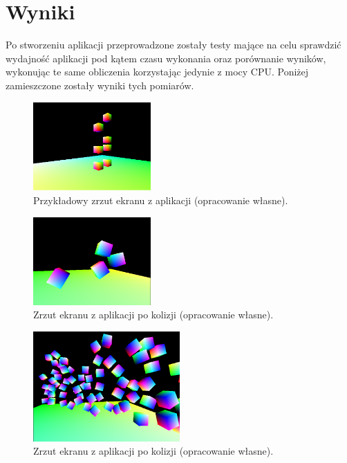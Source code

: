 \chapter{Wyniki}

Po stworzeniu aplikacji przeprowadzone zostały testy mające na celu sprawdzić wydajność aplikacji pod kątem czasu wykonania oraz porównanie wyników, wykonując te same obliczenia korzystając jedynie z mocy CPU. 
Poniżej zamieszczone zostały wyniki tych pomiarów.

\begin{figure}[h]
\centering
\includegraphics[width=0.4\textwidth]{figures/app1.png}
\caption{Przykładowy zrzut ekranu z aplikacji (opracowanie własne).}%
\label{rys:Przykladowy zrzut ekranu z aplikacji}
\end{figure}
\begin{figure}[h]
\centering
\includegraphics[width=0.4\textwidth]{figures/app2.png}
\caption{Zrzut ekranu z aplikacji po kolizji (opracowanie własne).}%
\label{rys:Zrzut ekranu z aplikacji po kolizji}
\end{figure}
\begin{figure}[h]
\centering
\includegraphics[width=0.5\textwidth]{figures/app3.png}
\caption{Zrzut ekranu z aplikacji po kolizji (opracowanie własne).}%
\label{rys:Zrzut ekranu z aplikacji po kolizji}
\end{figure}
